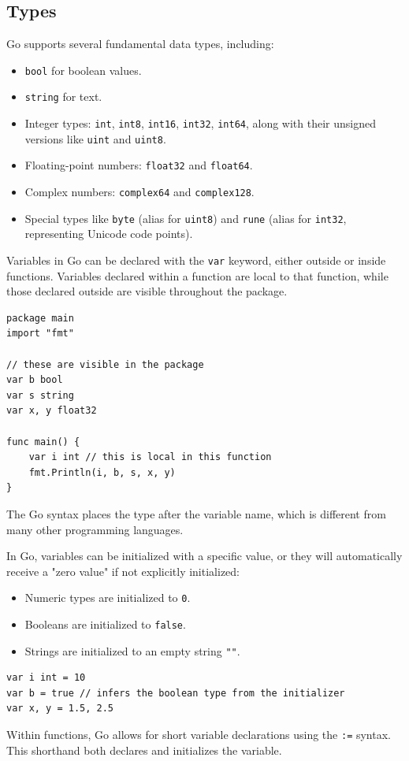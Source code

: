 \subsection*{Types}
Go supports several fundamental data types, including:
\begin{itemize}
    \item \texttt{bool} for boolean values.
    \item \texttt{string} for text.
    \item Integer types: \texttt{int}, \texttt{int8}, \texttt{int16}, \texttt{int32}, \texttt{int64}, along with their unsigned versions like \texttt{uint} and \texttt{uint8}.
    \item Floating-point numbers: \texttt{float32} and \texttt{float64}.
    \item Complex numbers: \texttt{complex64} and \texttt{complex128}.
    \item Special types like \texttt{byte} (alias for \texttt{uint8}) and \texttt{rune} (alias for \texttt{int32}, representing Unicode code points).
\end{itemize}

Variables in Go can be declared with the \texttt{var} keyword, either outside or inside functions. Variables declared within a function are local to that function, while those declared outside are visible throughout the package.

\begin{verbatim}
package main
import "fmt"

// these are visible in the package
var b bool
var s string
var x, y float32

func main() {
    var i int // this is local in this function
    fmt.Println(i, b, s, x, y)
}    
\end{verbatim}
The Go syntax places the type after the variable name, which is different from many other programming languages.

In Go, variables can be initialized with a specific value, or they will automatically receive a "zero value" if not explicitly initialized:
\begin{itemize}
    \item Numeric types are initialized to \texttt{0}.
    \item Booleans are initialized to \texttt{false}.
    \item Strings are initialized to an empty string \texttt{""}.
\end{itemize}

\begin{verbatim}
var i int = 10
var b = true // infers the boolean type from the initializer
var x, y = 1.5, 2.5
\end{verbatim}
Within functions, Go allows for short variable declarations using the \texttt{:=} syntax. This shorthand both declares and initializes the variable.

